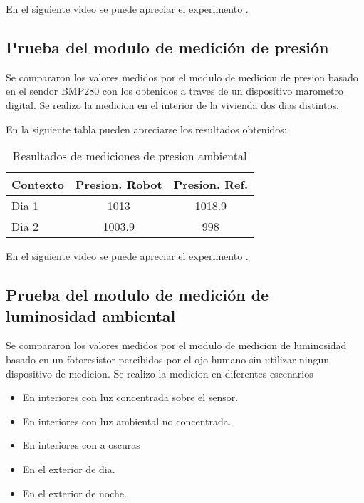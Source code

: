 En el siguiente video se puede apreciar el experimento \cite{Video_Prueba_TempHum}.

\subsection{Prueba del modulo de medición de presión}

Se compararon los valores medidos por el modulo de medicion de presion basado en el sendor BMP280 con los obtenidos a traves de un dispositivo marometro digital. Se realizo la medicion en el interior de la vivienda dos dias distintos.

En la siguiente tabla pueden apreciarse los resultados obtenidos:

\begin{table}[h]
\centering
\caption[Resultados de mediciones de presion ambiental]{Resultados de mediciones de presion ambiental}
\begin{tabular}{l c c}
\toprule
\textbf{Contexto} & \textbf{Presion. Robot} & \textbf{Presion. Ref.} \\
\midrule
Dia 1 & 1013 & 1018.9 \\
Dia 2 & 1003.9 & 998 \\
\bottomrule
\hline
\end{tabular}
\end{table}

En el siguiente video se puede apreciar el experimento \cite{Video_Prueba_Presion}.

\subsection{Prueba del modulo de medición de luminosidad ambiental}

Se compararon los valores medidos por el modulo de medicion de luminosidad basado en un fotoresistor percibidos por el ojo humano sin utilizar ningun dispositivo de medicion. Se realizo la medicion en diferentes escenarios

\begin{itemize}
	\item En interiores con luz concentrada sobre el sensor.
	\item En interiores con luz ambiental no concentrada.
	\item En interiores con a oscuras
	\item En el exterior de dia.
	\item En el exterior de noche.
\end{itemize}

